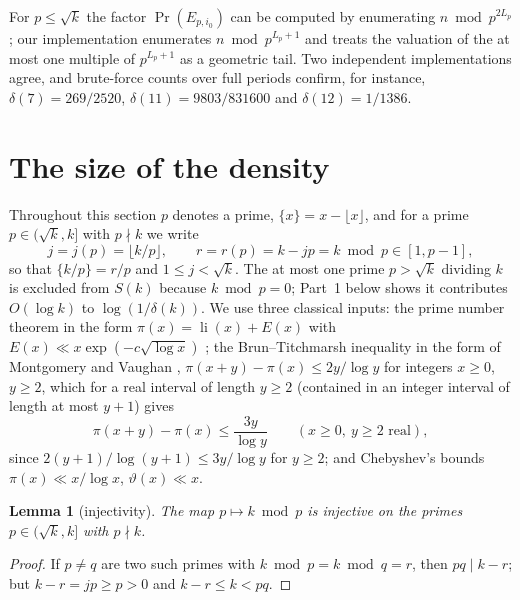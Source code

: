 \documentclass[11pt]{amsart}
\newtheorem{lemma}[theorem]{Lemma}
\theoremstyle{remark}
\renewcommand{\Pr}{\operatorname{Pr}}
\begin{document}
For $p\le\sqrt k$ the factor $\Pr(E_{p,i_0})$ can be computed by enumerating $n\bmod p^{2L_p}$; our implementation enumerates $n\bmod p^{L_p+1}$ and treats the valuation of the at most one multiple of $p^{L_p+1}$ as a geometric tail. Two independent implementations agree, and brute-force counts over full periods confirm, for instance, $\delta(7)=269/2520$, $\delta(11)=9803/831600$ and $\delta(12)=1/1386$.

\section{The size of the density}\label{sec:asymp}

Throughout this section $p$ denotes a prime, $\{x\}=x-\lfloor x\rfloor$, and for a prime $p\in(\sqrt k,k]$ with $p\nmid k$ we write
\[j=j(p)=\lfloor k/p\rfloor,\qquad r=r(p)=k-jp=k\bmod p\in[1,p-1],\]
so that $\{k/p\}=r/p$ and $1\le j<\sqrt k$. The at most one prime $p>\sqrt k$ dividing $k$ is excluded from $S(k)$ because $k\bmod p=0$; Part~1 below shows it contributes $O(\log k)$ to $\log(1/\delta(k))$. We use three classical inputs: the prime number theorem in the form $\pi(x)=\operatorname{li}(x)+E(x)$ with $E(x)\ll x\exp(-c\sqrt{\log x})$ \cite{dlVP}; the Brun--Titchmarsh inequality in the form of Montgomery and Vaughan \cite{MV73}, $\pi(x+y)-\pi(x)\le2y/\log y$ for integers $x\ge0$, $y\ge2$, which for a real interval of length $y\ge2$ (contained in an integer interval of length at most $y+1$) gives
\begin{equation}\label{eq:BT}
\pi(x+y)-\pi(x)\le\frac{3y}{\log y}\qquad(x\ge0,\ y\ge2\text{ real}),
\end{equation}
since $2(y+1)/\log(y+1)\le3y/\log y$ for $y\ge2$; and Chebyshev's bounds $\pi(x)\ll x/\log x$, $\vartheta(x)\ll x$.

\begin{lemma}[injectivity]\label{lem:A}
The map $p\mapsto k\bmod p$ is injective on the primes $p\in(\sqrt k,k]$ with $p\nmid k$.
\end{lemma}
\begin{proof}
If $p\ne q$ are two such primes with $k\bmod p=k\bmod q=r$, then $pq\mid k-r$; but $k-r=jp\ge p>0$ and $k-r\le k<pq$.
\end{proof}
\end{document}
